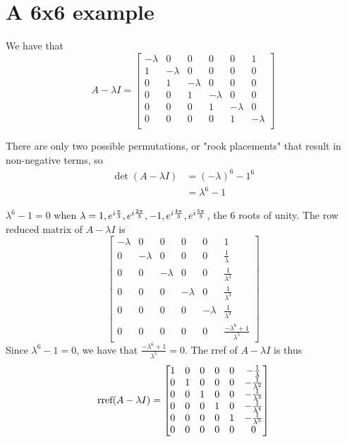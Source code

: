 \newcommand{\eigenvector}[1]{
    \begin{bmatrix} 
        \frac{1}{#1}, 
        \frac{1}{(#1)^2}, 
        \frac{1}{(#1)^3},
        \frac{1}{(#1)^4},
        \frac{1}{(#1)^5},
        1,
     \end{bmatrix}
}
\section{A 6x6 example}

We have that
\[
A-\lambda I =
\begin{bmatrix}
    -\lambda & 0 & 0 & 0 & 0 & 1\\
    1 & -\lambda & 0 & 0 & 0 & 0\\
    0 & 1 & -\lambda & 0 & 0 & 0\\
    0 & 0 & 1 & -\lambda & 0 & 0\\
    0 & 0 & 0 & 1 & -\lambda & 0\\
    0 & 0 & 0 & 0 & 1 & -\lambda\\
\end{bmatrix}
\]

There are only two possible permutations,
or "rook placements" that result in non-negative terms, so
\begin{align}
    \det(A-\lambda I)
    &= (-\lambda)^6 - 1^6 \\
    &= \lambda^6 - 1
\end{align}

$\lambda^6 - 1 = 0$ when $\lambda = 
1, e^{i\frac{\pi}{3}}, e^{i\frac{2\pi}{3}},
-1, e^{i\frac{4\pi}{3}}, e^{i\frac{5\pi}{3}}$, 
the 6 roots of unity.
The row reduced matrix of $A-\lambda I$ is
\[
\begin{bmatrix}
    -\lambda & 0 & 0 & 0 & 0 & 1\\
    0 & -\lambda & 0 & 0 & 0 & \frac{1}{\lambda}\\
    0 & 0 & -\lambda & 0 & 0 & \frac{1}{\lambda^2}\\
    0 & 0 & 0 & -\lambda & 0 & \frac{1}{\lambda^3}\\
    0 & 0 & 0 & 0 & -\lambda & \frac{1}{\lambda^4}\\
    0 & 0 & 0 & 0 & 0 & \frac{-\lambda^6+1}{\lambda^5}
\end{bmatrix}
\]
Since  $\lambda^6 - 1 = 0$, 
we have that $\frac{-\lambda^6+1}{\lambda^5} = 0$.
The rref of $A-\lambda I$ is thus
\[
\text{rref}(A-\lambda I) =
\begin{bmatrix}
    1 & 0 & 0 & 0 & 0 & -\frac{1}{\lambda}\\
    0 & 1 & 0 & 0 & 0 & -\frac{1}{\lambda^2}\\
    0 & 0 & 1 & 0 & 0 & -\frac{1}{\lambda^3}\\
    0 & 0 & 0 & 1 & 0 & -\frac{1}{\lambda^4}\\
    0 & 0 & 0 & 0 & 1 & -\frac{1}{\lambda^5}\\
    0 & 0 & 0 & 0 & 0 & 0
\end{bmatrix}
\]

